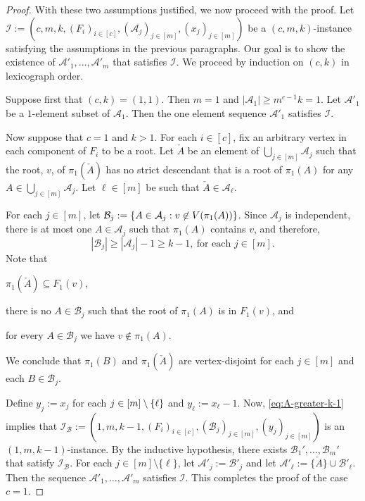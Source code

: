 \documentclass{patmorin}
\DeclarePairedDelimiter\set{\{}{\}}
\renewcommand{\mid}{:}  %
\begin{document}
\begin{proof}
  With these two assumptions justified, we now proceed with the proof.  Let $\mathcal{I}:=(c,m,k,(F_i)_{i\in[c]},(\mathcal{A}_j)_{j\in[m]},(x_j)_{j\in[m]})$ be a $(c,m,k)$-instance satisfying the assumptions in the previous paragraphs.  Our goal is to show the existence of $\mathcal{A}'_1,\ldots,\mathcal{A}'_m$ that satisfies $\mathcal{I}$.  We proceed by induction on $(c,k)$ in lexicograph order.

  Suppose first that $(c,k)=(1,1)$. Then $m=1$ and $|\mathcal{A}_1|\ge m^{c-1} k=1$.  Let $\mathcal{A}'_1$ be a $1$-element subset of $\mathcal{A}_1$.  Then the one element sequence $\mathcal{A}'_1$ satisfies $\mathcal{I}$.

  Now suppose that $c=1$ and $k>1$. For each $i\in[c]$, fix an arbitrary vertex in each component of $F_i$ to be a root. Let $\check{A}$ be an element of $\bigcup_{j\in[m]}\mathcal{A}_j$ such that the root, $v$, of $\pi_1(\check{A})$ has no strict descendant that is a root of $\pi_1(A)$ for any $A\in\bigcup_{j\in[m]}\mathcal{A}_j$. Let $\ell\in[m]$ be such that $\check{A}\in\mathcal{A}_{\ell}$.

  For each $j\in[m]$, let $\mathcal{B}_j:=\set{A\in\mathcal{A}_j\mid v\not\in V(\pi_1(A))}$. Since $\mathcal{A}_j$ is independent, there is at most one $A\in\mathcal{A}_j$ such that $\pi_1(A)$ contains $v$, and therefore,
  \begin{equation}
    |\mathcal{B}_j|\geq |\mathcal{A}_j|-1\geq k-1,\ \textrm{for each $j\in[m]$}. \label{eq:A-greater-k-1}
  \end{equation}
  Note that
  \begin{enumerate*}[label=(\arabic*)]
    \item $\pi_1(\check{A})\subseteq F_1(v)$,
    \item there is no $A\in\mathcal{B}_j$ such that the root of $\pi_1(A)$ is in $F_1(v)$, and
    \item for every $A\in\mathcal{B}_j$ we have $v\notin\pi_1(A)$.
  \end{enumerate*}
  We conclude that $\pi_1(B)$ and $\pi_1(\check{A})$ are vertex-disjoint for each $j\in[m]$ and each $B\in\mathcal{B}_j$.

  Define $y_j:=x_j$ for each $j\in[m]\setminus\set{\ell}$ and $y_\ell:=x_{\ell}-1$. Now, \eqref{eq:A-greater-k-1} implies that $\mathcal{I}_\mathcal{B}:=(1,m,k-1,(F_i)_{i\in[c]},(\mathcal{B}_j)_{j\in[m]},(y_j)_{j\in[m]})$ is an $(1,m,k-1)$-instance.  By the inductive hypothesis, there exists $\mathcal{B}_1',\ldots,\mathcal{B}_m'$ that satisfy $\mathcal{I}_\mathcal{B}$. For each $j\in[m]\setminus\{\ell\}$, let $\mathcal{A}'_j:=\mathcal{B}'_j$ and let $\mathcal{A}'_\ell:= \{\check{A}\} \cup \mathcal{B}'_\ell$. Then the sequence $\mathcal{A}'_1,\ldots,\mathcal{A}'_m$ satisfies $\mathcal{I}$. This completes the proof of the case $c=1$.


\end{proof}
\end{document}
